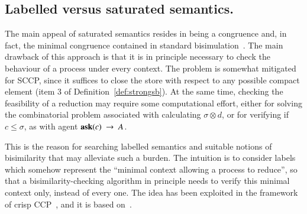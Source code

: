 \documentclass[main.tex]{subfiles}
\begin{document}


\subsection{Labelled versus saturated semantics.} The main appeal of saturated semantics resides in 
 being a congruence and, in fact, the minimal congruence contained in standard bisimulation~\cite{barbedMontanari}. The main drawback of this approach is that it
is in principle necessary to check the behaviour of a process under every context. The problem is somewhat mitigated for SCCP, since it suffices to close the store with respect to any possible compact element (item 3 of Definition~\ref{def:strongsb}).
%
At the same time, checking the feasibility of a reduction may require some computational effort, either for solving the combinatorial problem 
associated with calculating $\sigma \otimes d$, or for verifying if $c \leq \sigma$, as with agent ${\bf ask}(c) \ \rightarrow \ A$. 

This is the reason for searching labelled semantics and suitable notions of bisimilarity that may alleviate such a burden. 
%
The intuition is to consider labels which somehow represent  the ``minimal context allowing a process to reduce'', so that a bisimilarity-checking algorithm in principle needs  to verify this minimal context only, instead of every one. 
%
The idea has been exploited in the framework of crisp CCP~\cite{pippo}, and it 
is based on~\cite{Leifer:00:CONCUR,Bonchi:09:FOSSACS}.
\end{document}
